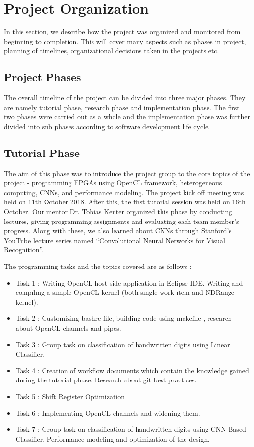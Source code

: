 \chapter{Project Organization}
In this section, we describe how the project was organized and monitored from beginning to completion. This will cover many aspects such as phases in project, planning of timelines, organizational decisions taken in the projects etc. 


\section{Project Phases }
The overall timeline of the project can be divided into three major phases. They are namely tutorial phase, research phase and implementation phase. The first two phases were carried out as a whole and the implementation phase was further divided into sub phases according to software development life cycle.

\section{Tutorial Phase }
The aim of this phase was to introduce the project group to the core topics of the project - programming FPGAs using OpenCL framework, heterogeneous computing,  CNNs, and performance modeling. The project kick off meeting was held on 11th October 2018. After this, the first tutorial session was held on 16th October. Our mentor Dr. Tobias Kenter organized this phase by conducting lectures, giving programming assignments and evaluating each team member’s progress. Along with these, we also learned about CNNs through Stanford’s YouTube lecture series named “Convolutional Neural Networks for Visual Recognition”. 

The programming tasks and the topics covered are as follows : 
\begin{itemize}
\item Task 1 : Writing OpenCL host-side application in Eclipse IDE. Writing and compiling a simple OpenCL kernel (both single work item and NDRange kernel).  
\item Task 2 : Customizing bashrc file, building code using makefile , research about OpenCL channels and pipes.
\item Task 3 : Group task on classification of handwritten digits using Linear Classifier. 
\item Task 4 : Creation of workflow documents which contain the knowledge gained during the tutorial phase. Research about git best practices.
\item Task 5 : Shift Register Optimization
\item Task 6 : Implementing OpenCL channels and widening them. 
\item Task 7 : Group task on classification of handwritten digits using CNN Based Classifier. Performance modeling and optimization of the design.
\end{itemize}

